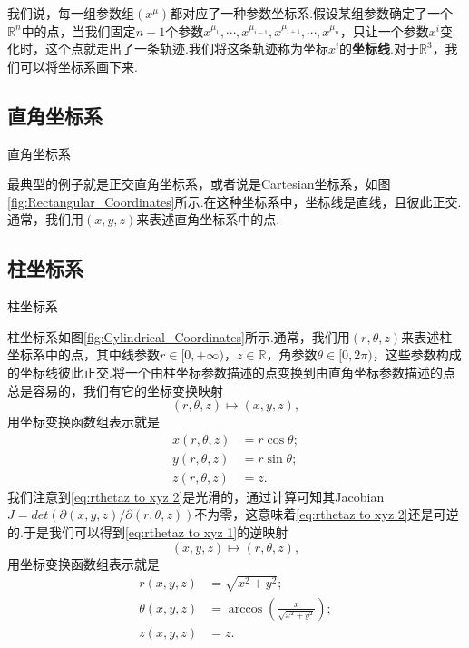 	我们说，每一组参数组$(x^\mu)$都对应了一种参数坐标系.假设某组参数确定了一个$\mathbb{R}^n$中的点，当我们固定$n-1$个参数$x^{\mu_1},\cdots,x^{\mu_{i-1}},x^{\mu_{i+1}},\cdots,x^{\mu_n}$，只让一个参数$x^i$变化时，这个点就走出了一条轨迹.我们将这条轨迹称为坐标$x^i$的\textbf{坐标线}.对于$\mathbb{R}^3$，我们可以将坐标系画下来.
	\subsection{直角坐标系}
		\begin{marginfigure}
			\centering
			
			\caption{直角坐标系}\label{fig:Rectangular_Coordinates}
		\end{marginfigure}
	最典型的例子就是正交直角坐标系，或者说是Cartesian坐标系，如图\ref{fig:Rectangular_Coordinates}所示.在这种坐标系中，坐标线是直线，且彼此正交.通常，我们用$(x,y,z)$来表述直角坐标系中的点.
	\subsection{柱坐标系}
		\begin{marginfigure}
			\centering
			
			\caption{柱坐标系}\label{fig:Cylindrical_Coordinates}
		\end{marginfigure}
		柱坐标系如图\ref{fig:Cylindrical_Coordinates}所示.通常，我们用$(r,\theta,z)$来表述柱坐标系中的点，其中线参数$r\in[0,+\infty)$，$z\in \mathbb{R}$，角参数$\theta\in[0,2\pi)$，这些参数构成的坐标线彼此正交.将一个由柱坐标参数描述的点变换到由直角坐标参数描述的点总是容易的，我们有它的坐标变换映射
		\begin{equation}\label{eq:rthetaz to xyz 1}
			(r,\theta,z)\mapsto(x,y,z),
		\end{equation}
		用坐标变换函数组表示就是
		\begin{equation}\label{eq:rthetaz to xyz 2}
			\begin{split}
				x(r,\theta,z)&=r\cos\theta;\\
				y(r,\theta,z)&=r\sin\theta;\\
				z(r,\theta,z)&=z.
			\end{split}
		\end{equation}
		我们注意到\ref{eq:rthetaz to xyz 2}是光滑的，通过计算可知其Jacobian$J=det(\partial(x,y,z)/\partial(r,\theta,z))$不为零，这意味着\ref{eq:rthetaz to xyz 2}还是可逆的.于是我们可以得到\ref{eq:rthetaz to xyz 1}的逆映射
		\begin{equation}\label{eq:xyz to rthetaz 1}
			(x,y,z)\mapsto(r,\theta,z),
		\end{equation}
		用坐标变换函数组表示就是
		\begin{equation}\label{eq:xyz to rthetaz 2}
			\begin{split}
				r(x,y,z)&=\sqrt{x^2+y^2};\\
				\theta(x,y,z)&=\arccos\left(\frac{x}{\sqrt{x^2+y^2}}\right);\\
				z(x,y,z)&=z.
			\end{split}
		\end{equation}
			
